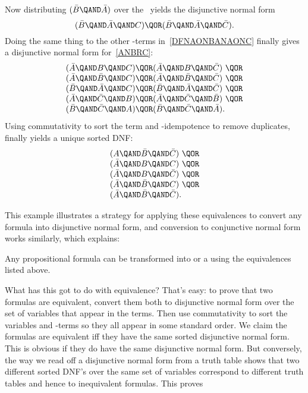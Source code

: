 \iffalse
$\bar{B} \QAND \bar{A}$
is equivalent to
\[
(\bar{B} \QAND \bar{A}) \QAND (C \QOR \bar{C}).
\]
\fi

Now distributing $(\bar{B} \QAND \bar{A})$ over the \QOR\ yields the
disjunctive normal form
\[
(\bar{B} \QAND \bar{A} \QAND C) \QOR
(\bar{B} \QAND \bar{A} \QAND \bar{C}).
\]
Doing the same thing to the other \QAND-terms in~\eqref{DFNAONBANAONC}
finally gives a disjunctive normal form for~\eqref{ANBRC}:
\[\begin{array}{l}
(\bar{A} \QAND B \QAND C) \QOR (\bar{A} \QAND B \QAND \bar{C})\ \QOR\\
(\bar{A} \QAND \bar{B} \QAND C) \QOR  (\bar{A} \QAND \bar{B} \QAND \bar{C})\ \QOR\\
(\bar{B} \QAND \bar{A} \QAND C) \QOR  (\bar{B} \QAND \bar{A} \QAND \bar{C})\ \QOR\\
(\bar{A} \QAND \bar{C} \QAND B) \QOR  (\bar{A} \QAND \bar{C} \QAND \bar{B})\ \QOR\\
(\bar{B} \QAND \bar{C} \QAND A) \QOR  (\bar{B} \QAND \bar{C} \QAND \bar{A}).
\end{array}\]
Using commutativity to sort the term and \QOR-idempotence to remove
duplicates, finally yields a unique sorted DNF:
\[\begin{array}{l}
(A \QAND \bar{B} \QAND \bar{C})\ \QOR\\
(\bar{A} \QAND B \QAND C)\ \QOR\\
(\bar{A} \QAND B \QAND \bar{C})\ \QOR\\
(\bar{A} \QAND \bar{B} \QAND C)\ \QOR\\
(\bar{A} \QAND \bar{B} \QAND \bar{C}).
\end{array}\]

This example illustrates a strategy for applying these equivalences to
convert any formula into disjunctive normal form, and conversion to
conjunctive normal form works similarly, which explains:
\begin{theorem}\label{completeDNF}
Any propositional formula can be transformed into  or a  using the
equivalences listed above.
\end{theorem}

What has this got to do with equivalence?  That's easy: to prove that
two formulas are equivalent, convert them both to disjunctive normal
form over the set of variables that appear in the terms.  Then use
commutativity to sort the variables and \QAND-terms so they all appear
in some standard order.  We claim the formulas are equivalent iff they
have the same sorted disjunctive normal form.  This is obvious if they
do have the same disjunctive normal form.  But conversely, the way we
read off a disjunctive normal form from a truth table shows that two
different sorted DNF's over the same set of variables correspond to
different truth tables and hence to inequivalent formulas.  This
proves

